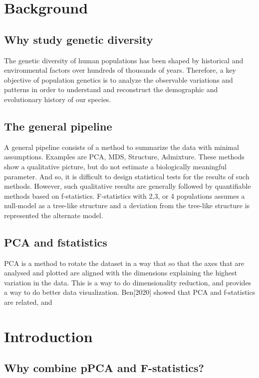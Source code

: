 \documentclass[12pt, letterpaper]{article}
\begin{document}
\section{Background}

\subsection{Why study genetic diversity}
The genetic diversity of human populations has been shaped by historical and environmental factors over hundreds of thousands of years. Therefore, a key objective of population genetics is to analyze the observable variations and patterns in order to understand and reconstruct the demographic and evolutionary history of our species. 

\subsection{The general pipeline}

A general pipeline consists of a method to summarize the data with minimal assumptions. Examples are PCA, MDS, Structure, Admixture. These methods show a qualitative picture, but do not estimate a biologically meaningful parameter. And so, it is difficult to design statistical tests for the results of such methods. However, such qualitative results are generally followed by quantifiable methods based on f-statistics. F-statistics with 2,3, or 4 populations assumes a null-model as a tree-like structure and a deviation from the tree-like structure is represented the alternate model.

\subsection{PCA and fstatistics}
PCA is a method to rotate the dataset in a way that so that the axes that are analysed and plotted are aligned with the dimensions explaining the highest variation in the data. This is a way to do dimensionality reduction, and provides a way to do better data visualization. Ben[2020] showed that PCA and f-statistics are related, and   


\section{Introduction}
\subsection{Why combine pPCA and F-statistics?}
\end{document}
